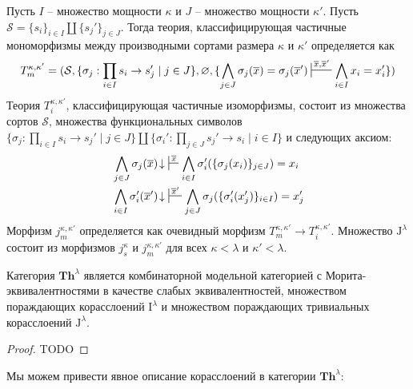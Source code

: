 \documentclass[reqno]{amsart}
\theoremstyle{definition}
\theoremstyle{remark}
\newcommand{\bcat}[1]{\mathbf{#1}}
\newcommand{\Th}{\bcat{Th}}
\newcommand{\I}{\mathrm{I}}
\newcommand{\J}{\mathrm{J}}
\begin{document}
Пусть $I$ -- множество мощности $\kappa$ и $J$ -- множество мощности $\kappa'$.
Пусть $\mathcal{S} = \{ s_i \}_{i \in I} \amalg \{ s_j' \}_{j \in J}$.
Тогда теория, классифицирующая частичные мономорфизмы между производными сортами размера $\kappa$ и $\kappa'$ определяется как
\[ T_m^{\kappa,\kappa'} = (\mathcal{S}, \{ \sigma_j : \prod_{i \in I} s_i \to s_j' \mid j \in J \}, \varnothing, \{ \bigwedge_{j \in J} \sigma_j(\overline{x}) = \sigma_j(\overline{x}') \sststile{}{\overline{x},\overline{x}'} \bigwedge_{i \in I} x_i = x_i' \}) \]
Теория $T_i^{\kappa,\kappa'}$, классифицирующая частичные изоморфизмы, состоит из множества сортов $\mathcal{S}$, множества функциональных символов $\{ \sigma_j : \prod_{i \in I} s_i \to s_j' \mid j \in J \} \amalg \{ \sigma_i' : \prod_{j \in J} s_j' \to s_i \mid i \in I \}$ и следующих аксиом:
\begin{align*}
& \bigwedge_{j \in J} \sigma_j(\overline{x})\!\downarrow\ \sststile{}{\overline{x}} \bigwedge_{i \in I} \sigma_i'(\{ \sigma_j(x_i) \}_{j \in J}) = x_i \\
& \bigwedge_{i \in I} \sigma_i'(\overline{x}')\!\downarrow\ \sststile{}{\overline{x}'} \bigwedge_{j \in J} \sigma_j(\{ \sigma_i'(x_j') \}_{i \in I}) = x_j'
\end{align*}
Морфизм $j_m^{\kappa,\kappa'}$ определяется как очевидный морфизм $T_m^{\kappa,\kappa'} \to T_i^{\kappa,\kappa'}$.
Множество $\J^\lambda$ состоит из морфизмов $j^\kappa_s$ и $j_m^{\kappa,\kappa'}$ для всех $\kappa < \lambda$ и $\kappa' < \lambda$.

\begin{prop}
Категория $\Th^\lambda$ является комбинаторной модельной категорией с Морита-эквивалентностями в качестве слабых эквивалентностей, множеством пораждающих корасслоений $\I^\lambda$ и множеством пораждающих тривиальных корасслоений $\J^\lambda$.
\end{prop}
\begin{proof}
TODO
\end{proof}

Мы можем привести явное описание корасслоений в категории $\Th^\lambda$:
\end{document}

